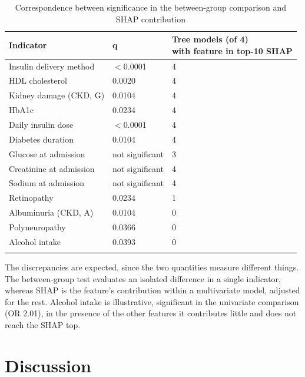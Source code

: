 \documentclass[pdflatex,sn-basic,Numbered]{sn-jnl}
\begin{document}
\begin{table}[h]
\caption{Correspondence between significance in the between-group comparison and SHAP contribution}\label{tab5}%
\begin{tabular}{@{}lll@{}}
\toprule
Indicator & q & \shortstack{Tree models (of 4)\\with feature in top-10 SHAP}\\
\midrule
Insulin delivery method & $<$0.0001 & 4\\
HDL cholesterol & 0.0020 & 4\\
Kidney damage (CKD, G) & 0.0104 & 4\\
HbA1c & 0.0234 & 4\\
Daily insulin dose & $<$0.0001 & 4\\
Diabetes duration & 0.0104 & 4\\
Glucose at admission & not significant & 3\\
Creatinine at admission & not significant & 4\\
Sodium at admission & not significant & 4\\
Retinopathy & 0.0234 & 1\\
Albuminuria (CKD, A) & 0.0104 & 0\\
Polyneuropathy & 0.0366 & 0\\
Alcohol intake & 0.0393 & 0\\
\botrule
\end{tabular}
\end{table}

The discrepancies are expected, since the two quantities measure different things. The between-group test evaluates an isolated difference in a single indicator, whereas SHAP is the feature's contribution within a multivariate model, adjusted for the rest. Alcohol intake is illustrative, significant in the univariate comparison (OR 2.01), in the presence of the other features it contributes little and does not reach the SHAP top.

\section{Discussion}\label{sec4}
\end{document}
